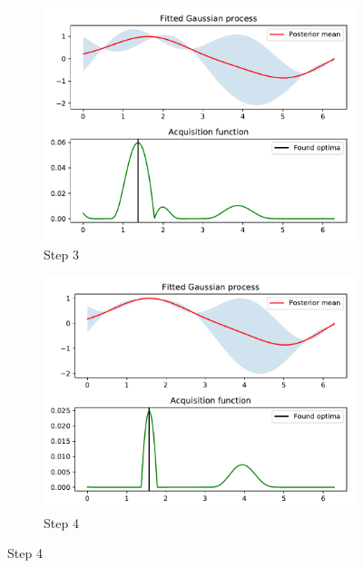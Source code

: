 \documentclass[10pt,a4paper,twoside]{book}
\begin{document}
\begin{figure}
	\begin{subfigure}[b]{0.45\textwidth}
		\caption{Step 3}
		\includegraphics[width=\textwidth]{figures/chapter3/sine/2.pdf}
	\end{subfigure}
	\begin{subfigure}[b]{0.45\textwidth}
		\caption{Step 4}
		\includegraphics[width=\textwidth]{figures/chapter3/sine/3.pdf}
	\end{subfigure}
	

\end{figure}
\end{document}
